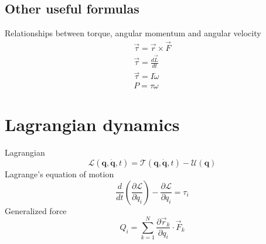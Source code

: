 \subsection{Other useful formulas}
Relationships between torque, angular momentum and angular velocity
\begin{align}
    \vec{\tau} = \vec{r} \times \vec{F}\\
    \vec{\tau} = \frac{d\vec{L}}{dt}\\
    \vec{\tau} = I \dot{\omega}\\
    P = \tau \omega
\end{align}

\section{Lagrangian dynamics}
Lagrangian
\begin{equation}
    \mathcal{L}(\mathbf{q, \dot{q}}, t) = \mathcal{T}(\mathbf{q, \dot{q}}, t) - \mathcal{U}(\mathbf{q})
\end{equation}
Lagrange's equation of motion
\begin{equation}
    \frac{d}{dt} \left( \frac{\partial \mathcal{L}}{\partial \dot{q}_i} \right) - \frac{\partial \mathcal{L}}{\partial q_i} = \tau_i
\end{equation}
Generalized force
\begin{equation}
    Q_i = \sum_{k=1}^N \frac{\partial \vec{r}_k}{\partial q_i} \cdot \vec{F}_k
\end{equation}
